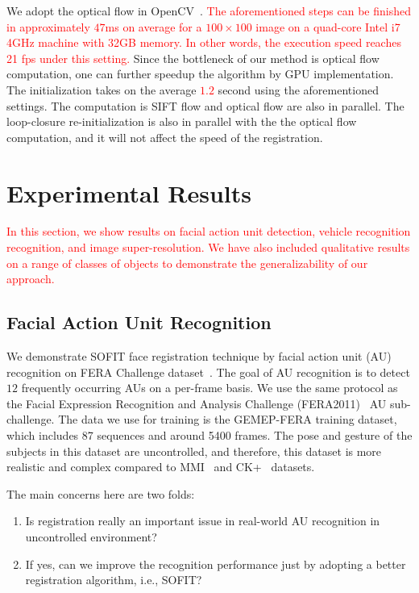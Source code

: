 \documentclass[10pt,journal]{IEEEtran}
\newcommand{\Songfan}[1]{\textcolor{red}{#1}}
\begin{document}
We adopt the optical flow in OpenCV~\cite{opencv}. \Songfan{The aforementioned steps can be finished in approximately $47$ms on average for a $100\times100$ image on a quad-core Intel i7 4GHz machine with 32GB memory. In other words, the execution speed reaches 21 fps under this setting. }Since the bottleneck of our method is optical flow computation, one can further speedup the algorithm by GPU implementation. The initialization takes on the average \Songfan{$1.2$} second using the aforementioned settings. The computation is SIFT flow and optical flow are also in parallel. The loop-closure re-initialization is also in parallel with the the optical flow computation, and it will not affect the speed of the registration. 


\section{\label{sec:experiment}Experimental Results}

\Songfan{In this section, we show results on facial action unit detection, vehicle recognition recognition, and image super-resolution. We have also included qualitative results on a range of classes of objects to demonstrate the generalizability of our approach.}

\subsection{Facial Action Unit Recognition}

We demonstrate SOFIT face registration technique by facial action unit (AU) recognition on FERA Challenge dataset~\cite{FERA11}. The goal of AU recognition is to detect $12$ frequently occurring AUs on a per-frame basis. We use the same protocol as the Facial Expression Recognition and Analysis Challenge (FERA2011)~\cite{Valstar_FERA11} AU sub-challenge. The data we use for training is the GEMEP-FERA training dataset, which includes 87 sequences and around 5400 frames. The pose and gesture of the subjects in this dataset are uncontrolled, and therefore, this dataset is more realistic and complex compared to MMI~\cite{Pantic_ICME05} and CK+~\cite{Kanade_FG00} datasets.

The main concerns here are two folds:
\begin{enumerate}
\item Is registration really an important issue in real-world AU recognition in uncontrolled environment?
\item If yes, can we improve the recognition performance just by adopting a better registration algorithm, i.e., SOFIT?
\end{enumerate}
\end{document}
